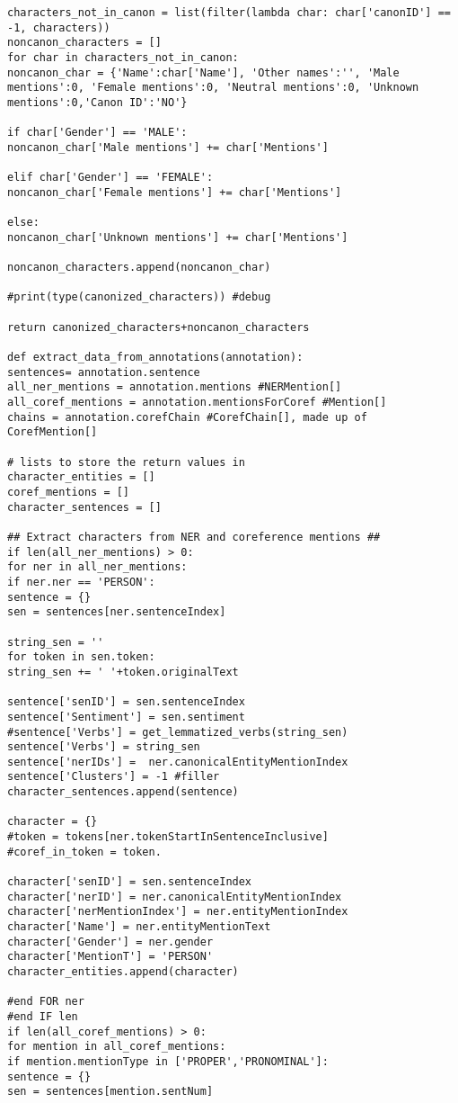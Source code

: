 \documentclass{pre-tfg}
\begin{document}
\begin{lstlisting}[style=consola]
characters_not_in_canon = list(filter(lambda char: char['canonID'] == -1, characters))
noncanon_characters = []
for char in characters_not_in_canon:
noncanon_char = {'Name':char['Name'], 'Other names':'', 'Male mentions':0, 'Female mentions':0, 'Neutral mentions':0, 'Unknown mentions':0,'Canon ID':'NO'}

if char['Gender'] == 'MALE':
noncanon_char['Male mentions'] += char['Mentions']

elif char['Gender'] == 'FEMALE':
noncanon_char['Female mentions'] += char['Mentions']

else:
noncanon_char['Unknown mentions'] += char['Mentions']

noncanon_characters.append(noncanon_char)

#print(type(canonized_characters)) #debug

return canonized_characters+noncanon_characters

def extract_data_from_annotations(annotation):
sentences= annotation.sentence
all_ner_mentions = annotation.mentions #NERMention[]
all_coref_mentions = annotation.mentionsForCoref #Mention[]
chains = annotation.corefChain #CorefChain[], made up of CorefMention[]

# lists to store the return values in
character_entities = []
coref_mentions = []
character_sentences = []

## Extract characters from NER and coreference mentions ##
if len(all_ner_mentions) > 0:
for ner in all_ner_mentions:
if ner.ner == 'PERSON':
sentence = {}
sen = sentences[ner.sentenceIndex]

string_sen = ''
for token in sen.token: 
string_sen += ' '+token.originalText

sentence['senID'] = sen.sentenceIndex
sentence['Sentiment'] = sen.sentiment
#sentence['Verbs'] = get_lemmatized_verbs(string_sen)
sentence['Verbs'] = string_sen
sentence['nerIDs'] =  ner.canonicalEntityMentionIndex
sentence['Clusters'] = -1 #filler
character_sentences.append(sentence)

character = {}
#token = tokens[ner.tokenStartInSentenceInclusive]
#coref_in_token = token.

character['senID'] = sen.sentenceIndex
character['nerID'] = ner.canonicalEntityMentionIndex
character['nerMentionIndex'] = ner.entityMentionIndex
character['Name'] = ner.entityMentionText
character['Gender'] = ner.gender
character['MentionT'] = 'PERSON'
character_entities.append(character)

#end FOR ner
#end IF len
if len(all_coref_mentions) > 0:
for mention in all_coref_mentions:
if mention.mentionType in ['PROPER','PRONOMINAL']:
sentence = {}
sen = sentences[mention.sentNum]


\end{lstlisting}
\end{document}
